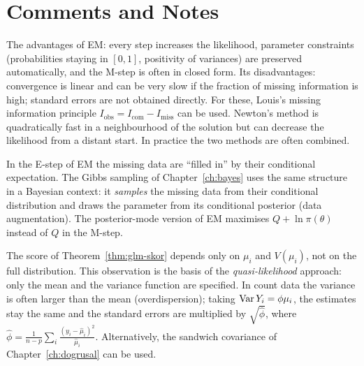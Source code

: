 \documentclass[main.tex]{subfiles}
\begin{document}
\section{Comments and Notes}

\begin{remark}
The advantages of EM: every step increases the likelihood, parameter constraints (probabilities staying in $[0,1]$, positivity of variances) are preserved automatically, and the M-step is often in closed form. Its disadvantages: convergence is linear and can be very slow if the fraction of missing information is high; standard errors are not obtained directly. For these, Louis's \cite{louis82} missing information principle $I_{\text{obs}}=I_{\text{com}}-I_{\text{miss}}$ can be used. Newton's method is quadratically fast in a neighbourhood of the solution but can decrease the likelihood from a distant start. In practice the two methods are often combined.
\end{remark}

\begin{remark}
In the E-step of EM the missing data are ``filled in'' by their conditional expectation. The Gibbs sampling of Chapter~\ref{ch:bayes} uses the same structure in a Bayesian context: it \emph{samples} the missing data from their conditional distribution and draws the parameter from its conditional posterior (data augmentation). The posterior-mode version of EM maximises $Q+\ln\pi(\theta)$ instead of $Q$ in the M-step.
\end{remark}

\begin{remark}
The score of Theorem~\ref{thm:glm-skor} depends only on $\mu_i$ and $V(\mu_i)$, not on the full distribution. This observation is the basis of the \emph{quasi-likelihood} approach: only the mean and the variance function are specified. In count data the variance is often larger than the mean (overdispersion); taking $\operatorname{Var} Y_i=\phi\mu_i$, the estimates stay the same and the standard errors are multiplied by $\sqrt{\hat\phi}$, where $\hat\phi=\frac1{n-p}\sum_i\frac{(y_i-\hat\mu_i)^2}{\hat\mu_i}$. Alternatively, the sandwich covariance of Chapter~\ref{ch:dogrusal} can be used.
\end{remark}
\end{document}
